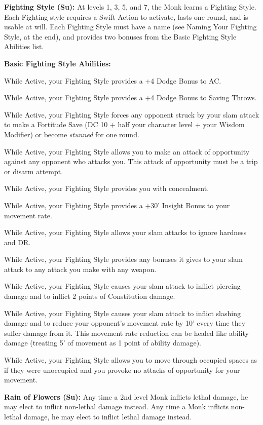 \textbf{Fighting Style (Su):} At levels 1, 3, 5, and 7, the Monk learns a Fighting Style. Each Fighting style requires a Swift Action to activate, lasts one round, and is usable at will. Each Fighting Style must have a name (see Naming Your Fighting Style, at the end), and provides two bonuses from the Basic Fighting Style Abilities list.

\textbf{Basic Fighting Style Abilities:}
\begin{itemize*}
\item While Active, your Fighting Style provides a +4 Dodge Bonus to AC.
\item While Active, your Fighting Style provides a +4 Dodge Bonus to Saving Throws.
\item While Active, your Fighting Style forces any opponent struck by your slam attack to make a Fortitude Save (DC 10 + half your character level + your Wisdom Modifier) or become \textit{stunned} for one round.
\item While Active, your Fighting Style allows you to make an attack of opportunity against any opponent who attacks you. This attack of opportunity must be a trip or disarm attempt.
\item While Active, your Fighting Style provides you with concealment.
\item While Active, your Fighting Style provides a +30' Insight Bonus to your movement rate.
\item While Active, your Fighting Style allows your slam attacks to ignore hardness and DR.
\item While Active, your Fighting Style provides any bonuses it gives to your slam attack to any attack you make with any weapon.
\item While Active, your Fighting Style causes your slam attack to inflict piercing damage and to inflict 2 points of Constitution damage.
\item While Active, your Fighting Style causes your slam attack to inflict slashing damage and to reduce your opponent's movement rate by 10' every time they suffer damage from it. This movement rate reduction can be healed like ability damage (treating 5' of movement as 1 point of ability damage).
\item While Active, your Fighting Style allows you to move through occupied spaces as if they were unoccupied and you provoke no attacks of opportunity for your movement.
\end{itemize*}

\textbf{Rain of Flowers (Su):} Any time a 2nd level Monk inflicts lethal damage, he may elect to inflict non-lethal damage instead. Any time a Monk inflicts non-lethal damage, he may elect to inflict lethal damage instead.

